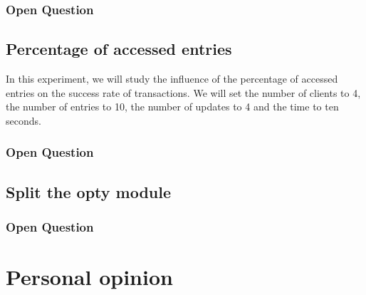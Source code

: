 \documentclass[a4paper, 11pt]{article}
\begin{document}
\subsubsection{Open Question}


\subsection{Percentage of accessed entries}
In this experiment, we will study the influence of the percentage of accessed entries on the success rate of transactions. We will set the number of clients to 4, the number of entries to 10, the number of updates to 4 and the time to ten seconds.


\subsubsection{Open Question}

\subsection{Split the opty module}

\subsubsection{Open Question}

\section{Personal opinion}
\end{document}
